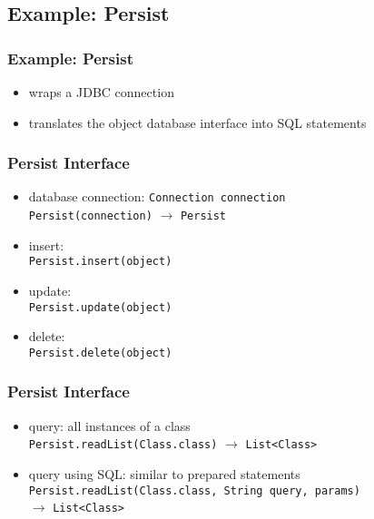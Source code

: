 \documentclass[dvipsnames]{beamer}
\theoremstyle{plain}
\begin{document}
\subsection{Example: Persist}

\begin{frame}
  \frametitle{Example: Persist}

  \begin{itemize}
    \item wraps a JDBC connection
    \item translates the object database interface into SQL statements
  \end{itemize}
\end{frame}

\begin{frame}
  \frametitle{Persist Interface}

  \begin{itemize}
    \item database connection: \lstinline!Connection connection!\\
      \lstinline!Persist(connection)! $\rightarrow$ \lstinline!Persist!

    \pause
    \medskip
    \item insert:\\
      \lstinline!Persist.insert(object)!
    \item update:\\
      \lstinline!Persist.update(object)!
    \item delete:\\
      \lstinline!Persist.delete(object)!
  \end{itemize}
\end{frame}

\begin{frame}
  \frametitle{Persist Interface}

  \begin{itemize}
    \item query: all instances of a class\\
      \lstinline!Persist.readList(Class.class)!
       $\rightarrow$ \lstinline!List<Class>!
    \item query using SQL: similar to prepared statements\\
      \lstinline!Persist.readList(Class.class, String query, params)!\\
       $\rightarrow$ \lstinline!List<Class>!
  \end{itemize}
\end{frame}
\end{document}
